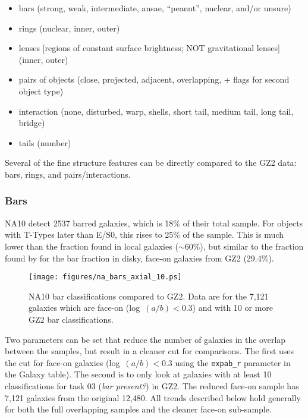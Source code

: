 \documentclass[useAMS,usenatbib]{mn2e}
\begin{document}
\begin{itemize}
	\item bars (strong, weak, intermediate, ansae, ``peanut'', nuclear, and/or unsure)
	\item rings (nuclear, inner, outer)
	\item lenses [regions of constant surface brightness; NOT gravitational lenses] (inner, outer)
	\item pairs of objects (close, projected, adjacent, overlapping, + flags for second object type)
	\item interaction (none, disturbed, warp, shells, short tail, medium tail, long tail, bridge)
	\item tails (number)
\end{itemize}

Several of the fine structure features can be directly compared to the GZ2 data: bars, rings, and pairs/interactions. 

\subsubsection{Bars}

NA10 detect 2537 barred galaxies, which is 18\% of their total sample. For objects with T-Types later than E/S0, this rises to 25\% of the sample. This is much lower than the fraction found in local galaxies ($\sim60\%$), but similar to the fraction found by \citep{mas11c} for the bar fraction in disky, face-on galaxies from GZ2 (29.4\%). 

\begin{figure*}
\texttt{[image: figures/na\_bars\_axial\_10.ps]}
\caption{NA10 bar classifications compared to GZ2. Data are for the 7,121 galaxies which are face-on (log~$(a/b)<0.3$) and with 10 or more GZ2 bar classifications. 
\label{fig-na_bars}}
\end{figure*}

Two parameters can be set that reduce the number of galaxies in the overlap between the samples, but result in a cleaner cut for comparisons. The first uses the \citet{mas11c} cut for face-on galaxies (log~$(a/b) < 0.3$ using the {\tt expab\_r} parameter in the Galaxy table). The second is to only look at galaxies with at least 10 classifications for task 03 ({\it bar present?}) in GZ2. The reduced face-on sample has 7,121 galaxies from the original 12,480. All trends described below hold generally for both the full overlapping samples and the cleaner face-on sub-sample.
\end{document}
